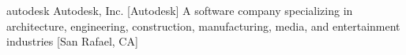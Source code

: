 \newglsXcompany%
{autodesk}%
{Autodesk, Inc.}%
[Autodesk]%
{A software company specializing in architecture, engineering, construction, manufacturing, media, and entertainment industries \cite{website:Autodesk}}%
[San Rafael, CA]%